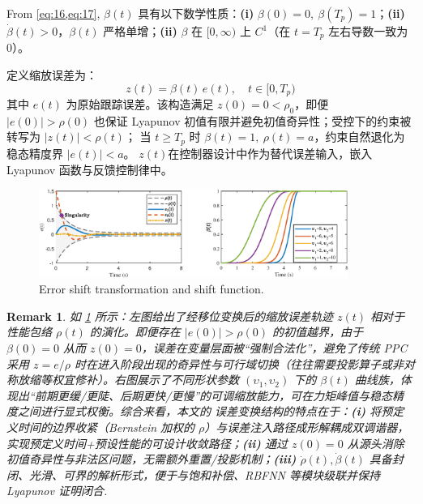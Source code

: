 \documentclass[pdflatex,sn-mathphys-num]{sn-jnl}%
\theoremstyle{thmstyleone}%
\theoremstyle{thmstyletwo}%
\newtheorem{remark}{Remark}%
\theoremstyle{thmstylethree}%
\begin{document}
From \cref{eq:16,eq:17}, ${\beta}(t)$ 具有以下数学性质：\textbf{(i)} $\beta(0)=0,\ \beta(T_p)=1$；\textbf{(ii)} $\dot\beta(t)>0$，$\beta(t)$ 严格单增；\textbf{(ii)} $\beta$ 在 $[0,\infty)$ 上 $C^1$（在 $t=T_p$ 左右导数一致为 $0$）。


定义缩放误差为：
\begin{equation}\label{eq:19}
z(t) = \beta(t)\,e(t), \quad  t \in [0, T_p)
\end{equation}
其中 $e(t)$ 为原始跟踪误差。该构造满足 $z(0)=0<\rho_0$，即便 $|e(0)|>\rho(0)$ 也保证 Lyapunov 初值有限并避免初值奇异性；受控下的约束被转写为 $|z(t)|<\rho(t)$； 当 $t\ge T_p$ 时 $\beta(t)=1,\ \rho(t)=a$，约束自然退化为稳态精度界 $|e(t)|<a$。 $z(t)$在控制器设计中作为替代误差输入，嵌入 Lyapunov 函数与反馈控制律中。



\begin{figure}[H]
	\centering
	\includegraphics[width=0.9\textwidth]{fig1.eps}
	\caption{Error shift transformation and shift function.}
	\label{fig:1}
\end{figure}
\begin{remark}
	如 \cref{fig:1} 所示：左图给出了经移位变换后的缩放误差轨迹 $z(t)$ 相对于性能包络 $\rho(t)$ 的演化。即便存在 $|e(0)|>\rho(0)$ 的初值越界，由于 $\beta(0)=0$ 从而 $z(0)=0$，误差在变量层面被“强制合法化”，避免了传统 PPC 采用 $z=e/\rho$ 时在进入阶段出现的奇异性与可行域切换（往往需要投影算子或非对称放缩等权宜修补）。右图展示了不同形状参数 $(\upsilon_1,\upsilon_2)$ 下的 $\beta(t)$ 曲线族，体现出“前期更缓/更陡、后期更快/更慢”的可调缩放能力，可在力矩峰值与稳态精度之间进行显式权衡。综合来看，本文的 误差变换结构的特点在于：\textbf{(i)} 将预定义时间的边界收紧（Bernstein 加权的 $\rho$）与误差注入路径成形解耦成双调谐器，实现预定义时间+预设性能的可设计收敛路径；\textbf{(ii)} 通过 $z(0)=0$ 从源头消除初值奇异性与非法区问题，无需额外重置/投影机制；\textbf{(iii)} $\dot\rho(t),\dot\beta(t)$ 具备封闭、光滑、可界的解析形式，便于与饱和补偿、RBFNN 等模块级联并保持 Lyapunov 证明闭合.
	\end{remark}
	
\end{document}
